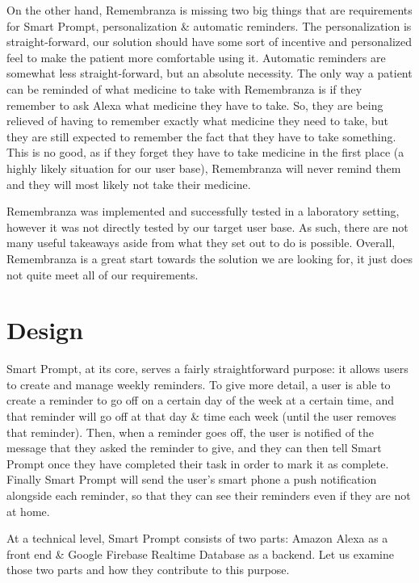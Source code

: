 \documentclass[11pt, oneside]{article}
\begin{document}
On the other hand, Remembranza is missing two big things that are requirements for Smart Prompt, personalization \& automatic reminders. 
The personalization is straight-forward, our solution should have some sort of incentive and personalized feel to make the patient more comfortable using it. 
Automatic reminders are somewhat less straight-forward, but an absolute necessity. 
The only way a patient can be reminded of what medicine to take with Remembranza is if they remember to ask Alexa what medicine they have to take. 
So, they are being relieved of having to remember exactly what medicine they need to take, but they are still expected to remember the fact that they have to take something. 
This is no good, as if they forget they have to take medicine in the first place (a highly likely situation for our user base), Remembranza will never remind them and they will most likely not take their medicine. 

Remembranza was implemented and successfully tested in a laboratory setting, however it was not directly tested by our target user base. 
As such, there are not many useful takeaways aside from what they set out to do is possible. 
Overall, Remembranza is a great start towards the solution we are looking for, it just does not quite meet all of our requirements. 





\section{Design}

Smart Prompt, at its core, serves a fairly straightforward purpose: it allows users to create and manage weekly reminders. 
To give more detail, a user is able to create a reminder to go off on a certain day of the week at a certain time, and that reminder will go off at that day \& time each week (until the user removes that reminder). 
Then, when a reminder goes off, the user is notified of the message that they asked the reminder to give, and they can then tell Smart Prompt once they have completed their task in order to mark it as complete. 
Finally Smart Prompt will send the user's smart phone a push notification alongside each reminder, so that they can see their reminders even if they are not at home. 

At a technical level, Smart Prompt consists of two parts: Amazon Alexa as a front end \& Google Firebase Realtime Database as a backend. 
Let us examine those two parts and how they contribute to this purpose. 
\end{document}
